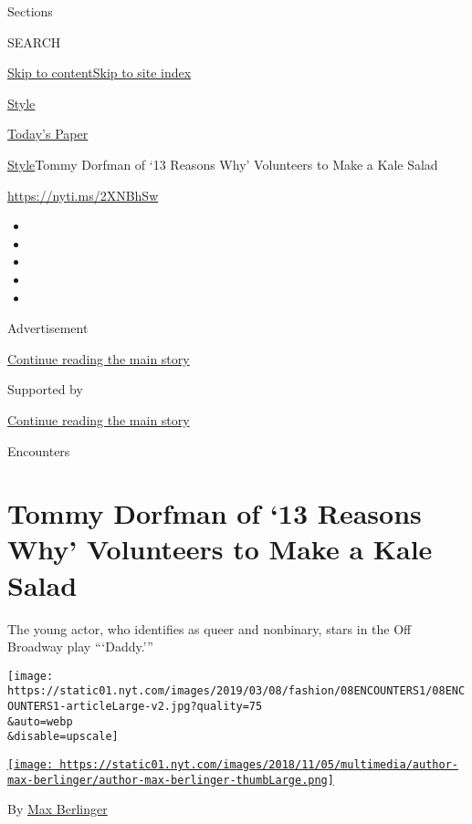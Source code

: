 Sections

SEARCH

\protect\hyperlink{site-content}{Skip to
content}\protect\hyperlink{site-index}{Skip to site index}

\href{https://www.nytimes.com/section/style}{Style}

\href{https://myaccount.nytimes.com/auth/login?response_type=cookie\&client_id=vi}{}

\href{https://www.nytimes.com/section/todayspaper}{Today's Paper}

\href{/section/style}{Style}\textbar{}Tommy Dorfman of `13 Reasons Why'
Volunteers to Make a Kale Salad

\href{https://nyti.ms/2XNBhSw}{https://nyti.ms/2XNBhSw}

\begin{itemize}
\item
\item
\item
\item
\item
\end{itemize}

Advertisement

\protect\hyperlink{after-top}{Continue reading the main story}

Supported by

\protect\hyperlink{after-sponsor}{Continue reading the main story}

Encounters

\hypertarget{tommy-dorfman-of-13-reasons-why-volunteers-to-make-a-kale-salad}{%
\section{Tommy Dorfman of `13 Reasons Why' Volunteers to Make a Kale
Salad}\label{tommy-dorfman-of-13-reasons-why-volunteers-to-make-a-kale-salad}}

The young actor, who identifies as queer and nonbinary, stars in the Off
Broadway play ```Daddy.'''

\texttt{[image: https://static01.nyt.com/images/2019/03/08/fashion/08ENCOUNTERS1/08ENCOUNTERS1-articleLarge-v2.jpg?quality=75\\\&auto=webp\\\&disable=upscale]}

\href{https://www.nytimes.com/by/max-berlinger}{\texttt{[image: https://static01.nyt.com/images/2018/11/05/multimedia/author-max-berlinger/author-max-berlinger-thumbLarge.png]}}

By \href{https://www.nytimes.com/by/max-berlinger}{Max Berlinger}

